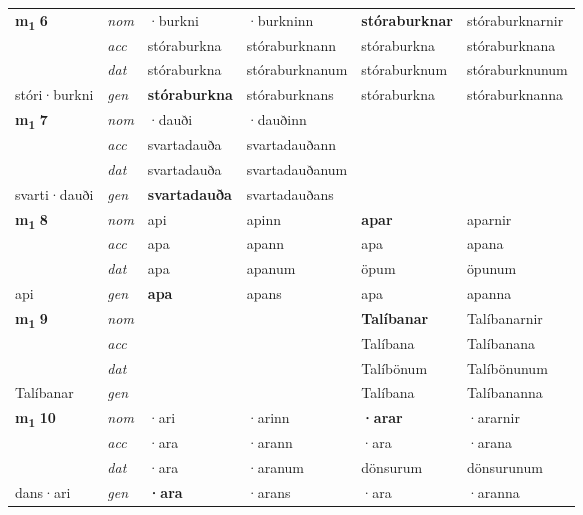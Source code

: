 \begin{longtable}[l]{X>{\footnotesize\itshape}XXXXX}
\multirow{3}{*}{{{\textbf{m{\textsubscript{1}}} \Large{\textbf{6}}}}} & nom & ·burkni & ·burkninn & \textbf{stóraburknar} & stóraburknarnir \\*
 & acc & stóraburkna & stóraburknann & stóraburkna & stóraburknana \\*
 & dat & stóraburkna & stóraburknanum & stóraburknum & stóraburknunum \\*
 {\footnotesize{stóri\allowbreak ·burkni}} & gen & \textbf{stóraburkna} & stóraburknans & stóraburkna & stóraburknanna \\
\midrule

\multirow{3}{*}{{{\textbf{m{\textsubscript{1}}} \Large{\textbf{7}}}}} & nom & ·dauði & ·dauðinn & \textbf{} &  \\*
 & acc & svartadauða & svartadauðann &  &  \\*
 & dat & svartadauða & svartadauðanum &  &  \\*
 {\footnotesize{svarti\allowbreak ·dauði}} & gen & \textbf{svartadauða} & svartadauðans &  &  \\
\midrule

\multirow{3}{*}{{{\textbf{m{\textsubscript{1}}} \Large{\textbf{8}}}}} & nom & api & apinn & \textbf{apar} & aparnir \\*
 & acc & apa & apann & apa & apana \\*
 & dat & apa & apanum & öpum & öpunum \\*
 {\footnotesize{api}} & gen & \textbf{apa} & apans & apa & apanna \\
\midrule

\multirow{3}{*}{{{\textbf{m{\textsubscript{1}}} \Large{\textbf{9}}}}} & nom &  &  & \textbf{Talíbanar} & Talíbanarnir \\*
 & acc &  &  & Talíbana & Talíbanana \\*
 & dat &  &  & Talíbönum & Talíbönunum \\*
 {\footnotesize{Talíbanar}} & gen & \textbf{} &  & Talíbana & Talíbananna \\
\midrule

\multirow{3}{*}{{{\textbf{m{\textsubscript{1}}} \Large{\textbf{10}}}}} & nom & ·ari & ·arinn & \textbf{·arar} & ·ararnir \\*
 & acc & ·ara & ·arann & ·ara & ·arana \\*
 & dat & ·ara & ·aranum & dönsurum & dönsurunum \\*
 {\footnotesize{dans\allowbreak ·ari}} & gen & \textbf{·ara} & ·arans & ·ara & ·aranna \\
\midrule


\end{longtable}
